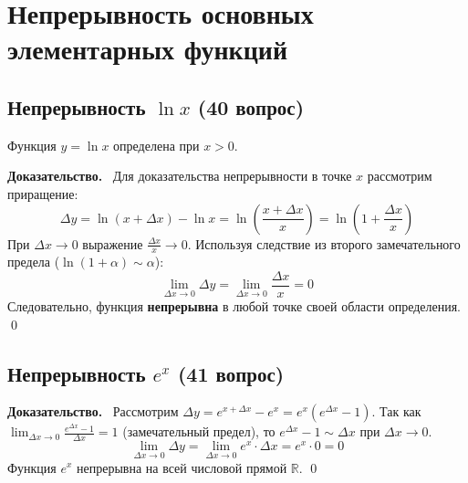 \documentclass[a4paper,12pt]{article}
\newcommand{\tsubsection}[2]{\subsection[#1]{\texorpdfstring{#2}{#1}}}
\newcommand{\myproof}{\textbf{Доказательство.}\ }
\begin{document}
	
	
	
	
	
	
	\newpage
	\section{Непрерывность основных элементарных функций}
	
	\tsubsection{Непрерывность логарифма (40 вопрос)}{Непрерывность $\ln x$ (40 вопрос)}
	
	Функция $y = \ln x$ определена при $x > 0$.
	
	\vspace{0.5cm}
	\myproof
	Для доказательства непрерывности в точке $x$ рассмотрим приращение:
	\[ \Delta y = \ln(x + \Delta x) - \ln x = \ln \left( \frac{x + \Delta x}{x} \right) = \ln \left( 1 + \frac{\Delta x}{x} \right) \]
	При $\Delta x \to 0$ выражение $\frac{\Delta x}{x} \to 0$. Используя следствие из второго замечательного предела ($\ln(1 + \alpha) \sim \alpha$):
	\[ \lim_{\Delta x \to 0} \Delta y = \lim_{\Delta x \to 0} \frac{\Delta x}{x} = 0 \]
	Следовательно, функция \textbf{непрерывна} в любой точке своей области определения. \qed
	
	\begin{center}
	\end{center}
	
	
	
	\newpage
	\tsubsection{Непрерывность экспоненты (41 вопрос)}{Непрерывность $e^x$ (41 вопрос)}
	
	\myproof
	Рассмотрим $\Delta y = e^{x + \Delta x} - e^x = e^x (e^{\Delta x} - 1)$.
	Так как $\lim_{\Delta x \to 0} \frac{e^{\Delta x} - 1}{\Delta x} = 1$ (замечательный предел), то $e^{\Delta x} - 1 \sim \Delta x$ при $\Delta x \to 0$.
	\[ \lim_{\Delta x \to 0} \Delta y = \lim_{\Delta x \to 0} e^x \cdot \Delta x = e^x \cdot 0 = 0 \]
	Функция $e^x$ непрерывна на всей числовой прямой $\mathbb{R}$. \qed
	
\end{document}
